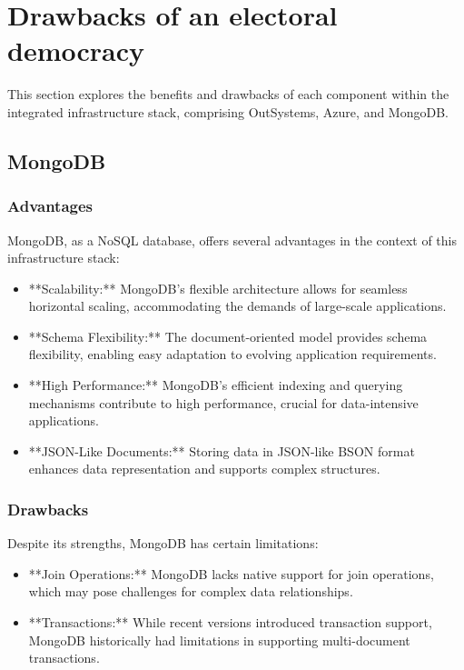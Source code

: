\section{Drawbacks of an electoral democracy}\label{sec:benefits_drawbacks}


    This section explores the benefits and drawbacks of each component within the integrated infrastructure stack, comprising OutSystems, Azure, and MongoDB.
    
    \subsection{MongoDB}
    
    \subsubsection{Advantages}
    MongoDB, as a NoSQL database, offers several advantages in the context of this infrastructure stack:
    
    \begin{itemize}
        \item **Scalability:** MongoDB's flexible architecture allows for seamless horizontal scaling, accommodating the demands of large-scale applications.
        \item **Schema Flexibility:** The document-oriented model provides schema flexibility, enabling easy adaptation to evolving application requirements.
        \item **High Performance:** MongoDB's efficient indexing and querying mechanisms contribute to high performance, crucial for data-intensive applications.
        \item **JSON-Like Documents:** Storing data in JSON-like BSON format enhances data representation and supports complex structures.
    \end{itemize}
    
    \subsubsection{Drawbacks}
    Despite its strengths, MongoDB has certain limitations:
    
    \begin{itemize}
        \item **Join Operations:** MongoDB lacks native support for join operations, which may pose challenges for complex data relationships.
        \item **Transactions:** While recent versions introduced transaction support, MongoDB historically had limitations in supporting multi-document transactions.
    \end{itemize}
    
